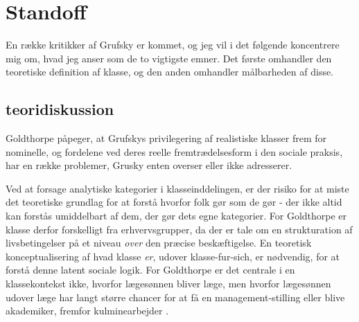 

\section{Standoff \label{2_klassestandoff}}

En række kritikker af Grufsky er kommet, og jeg vil i det følgende koncentrere mig om, hvad jeg anser som de to vigtigste emner. Det første omhandler den teoretiske definition af klasse, og den anden omhandler målbarheden af disse.


\subsection{teoridiskussion \label{2_kritikafgruskyteori}}

Goldthorpe påpeger, at Grufskys privilegering af realistiske klasser frem for nominelle, og fordelene ved deres reelle fremtrædelsesform i den sociale praksis, har en række problemer, Grusky enten overser eller ikke adresserer. 

Ved at forsage analytiske kategorier i klasseinddelingen, er der risiko for at miste det teoretiske grundlag for at forstå hvorfor folk gør som de gør - der ikke altid kan forstås umiddelbart af dem, der gør dets egne kategorier. For Goldthorpe er klasse derfor forskelligt fra erhvervsgrupper, da der er tale om en strukturation af livsbetingelser på et niveau \emph{over} den præcise beskæftigelse. En teoretisk konceptualisering af hvad klasse \emph{er}, udover klasse-fur-sich, er nødvendig, for at forstå denne latent sociale logik. For Goldthorpe er det centrale i en klassekontekst ikke, hvorfor lægesønnen bliver læge, men hvorfor lægesønnen udover læge har langt større chancer for at få en management-stilling eller blive akademiker, fremfor kulminearbejder \parencite[214]{Goldthorpe2002}. 




















